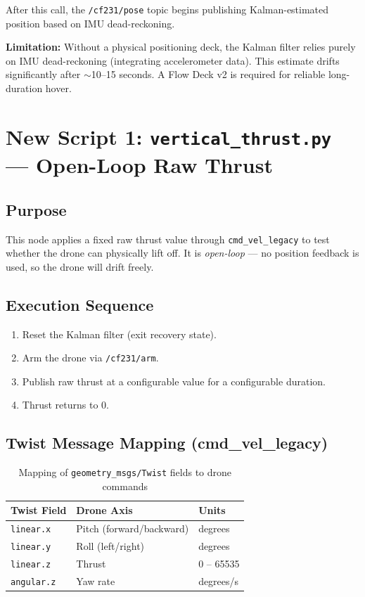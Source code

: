 \documentclass[11pt,a4paper]{article}
\begin{document}
After this call, the \texttt{/cf231/pose} topic begins publishing Kalman-estimated position based on IMU dead-reckoning.

\begin{warningbox}
\textbf{Limitation:} Without a physical positioning deck, the Kalman filter relies purely on IMU dead-reckoning (integrating accelerometer data). This estimate drifts significantly after $\sim$10--15 seconds. A Flow Deck v2 is required for reliable long-duration hover.
\end{warningbox}

\section{New Script 1: \texttt{vertical\_thrust.py} — Open-Loop Raw Thrust}

\subsection{Purpose}
This node applies a fixed raw thrust value through \texttt{cmd\_vel\_legacy} to test whether the drone can physically lift off. It is \emph{open-loop} — no position feedback is used, so the drone will drift freely.

\subsection{Execution Sequence}
\begin{enumerate}
    \item Reset the Kalman filter (exit recovery state).
    \item Arm the drone via \texttt{/cf231/arm}.
    \item Publish raw thrust at a configurable value for a configurable duration.
    \item Thrust returns to 0.
\end{enumerate}

\subsection{Twist Message Mapping (cmd\_vel\_legacy)}

\begin{table}[h!]
\centering
\caption{Mapping of \texttt{geometry\_msgs/Twist} fields to drone commands}
\vspace{0.3em}
\begin{tabular}{@{}lll@{}}
\toprule
\textbf{Twist Field} & \textbf{Drone Axis} & \textbf{Units} \\ \midrule
\texttt{linear.x}    & Pitch (forward/backward) & degrees \\
\texttt{linear.y}    & Roll (left/right)        & degrees \\
\texttt{linear.z}    & Thrust                   & 0 -- 65535 \\
\texttt{angular.z}   & Yaw rate                 & degrees/s \\ \bottomrule
\end{tabular}
\end{table}
\end{document}
